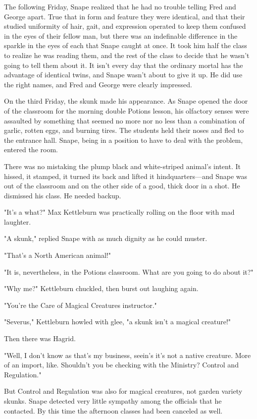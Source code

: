 The following Friday, Snape realized that he had no trouble telling Fred and George apart. True that in form and feature they were identical, and that their studied uniformity of hair, gait, and expression operated to keep them confused in the eyes of their fellow man, but there was an indefinable difference in the sparkle in the eyes of each that Snape caught at once. It took him half the class to realize he was reading them, and the rest of the class to decide that he wasn't going to tell them about it. It isn't every day that the ordinary mortal has the advantage of identical twins, and Snape wasn't about to give it up. He did use the right names, and Fred and George were clearly impressed.

On the third Friday, the skunk made his appearance. As Snape opened the door of the classroom for the morning double Potions lesson, his olfactory senses were assaulted by something that seemed no more nor no less than a combination of garlic, rotten eggs, and burning tires. The students held their noses and fled to the entrance hall. Snape, being in a position to have to deal with the problem, entered the room.

There was no mistaking the plump black and white-striped animal's intent. It hissed, it stamped, it turned its back and lifted it hindquarters—and Snape was out of the classroom and on the other side of a good, thick door in a shot. He dismissed his class. He needed backup.

"It's a what?" Max Kettleburn was practically rolling on the floor with mad laughter.

"A skunk," replied Snape with as much dignity as he could muster.

"That's a North American animal!"

"It is, nevertheless, in the Potions classroom. What are you going to do about it?"

"Why me?" Kettleburn chuckled, then burst out laughing again.

"You're the Care of Magical Creatures instructor."

"Severus," Kettleburn howled with glee, "a skunk isn't a magical creature!"

Then there was Hagrid.

"Well, I don't know as that's my business, seein's it's not a native creature. More of an import, like. Shouldn't you be checking with the Ministry? Control and Regulation."

But Control and Regulation was also for magical creatures, not garden variety skunks. Snape detected very little sympathy among the officials that he contacted. By this time the afternoon classes had been canceled as well.

